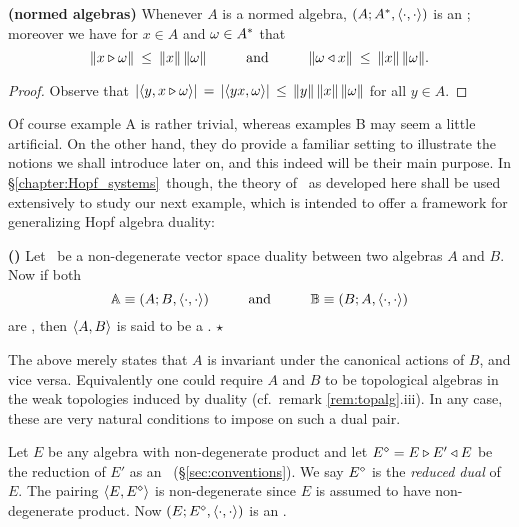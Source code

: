 \begin{exB} \label{exB:normed_algebra_context}  \rm
  {\bf (normed algebras)}  \hspace{0.6em}
  Whenever $A$ is a normed algebra, $(A; A^*, \langle\cdot, \cdot\rangle)$ is an \context;
  moreover we have for $x\in A$ and $\omega \in A^*$ that
  \begin{equation} \label{eq:exB:normed_algebra_context}
     \|x \lact \om\| \:\leq\:  \|x\|  \,  \|\om\|    \andspace{10mm}
     \|\om \ract x\| \:\leq\:  \|x\|  \,  \|\om\|.
  \end{equation}
\end{exB}
\begin{proof}
  Observe that
  $ |\langle y,x \triangleright \omega \rangle| \,=\, |\langle yx,\omega \rangle| \,\leq\,  \|y\|  \,  \|x\|  \, \|\omega\|$
  for all $y\in A$.
\end{proof}
\vspace{2ex}

{\small
Of course example A is rather trivial, whereas examples B may seem a little artificial.
On the other hand, they do provide a familiar setting to illustrate the notions we shall
introduce later on, and this indeed will be their main purpose.
In \S \ref{chapter:Hopf_systems}\ though, the theory of \contexts\ as
developed here shall be used extensively to study our next example,
which is intended to offer a framework for generalizing Hopf algebra duality:}


\begin{exC}  \label{exC:introduction} \rm
  {\bf (\dpa)}  \hspace{0.4em}
  Let \pairing\ be a non-degen\-erate vector space duality between two algebras
  $A$ and $B$\@. Now if both
  $$\Aa \equiv (A; B, \pairing)   \andspace{10mm}
    \BB \equiv (B; A, \pairing)$$
  are \contexts, then $\langle A,B \rangle$ is said to be a {\em \dpa}.
  \hfill $\star$
\end{exC}


  The above merely states that $A$ is invariant under the canonical actions of $B$,
  and vice versa. Equivalently one could require $A$ and $B$ to be topological algebras
  in the weak topologies induced by duality (cf.\ remark \ref{rem:topalg}.iii).
  In any case, these are very natural conditions to impose on such a dual pair.


\begin{exD} \label{exD:introduction} \rm
  Let $E$ be any algebra with non-degenerate product and let $E^\diamond = E\triangleright E' \triangleleft E$
  be the reduction of $E'$ as an \Ebimod\ (\S\ref{sec:conventions}).
  We say $E^\diamond$ is the {\em reduced dual\/} of $E$.
  The pairing $\langle E,E^\diamond \rangle$ is non-degenerate since $E$ is
  assumed to have non-degenerate product.
  Now $(E;E^\diamond,\langle\cdot, \cdot\rangle)$ is an \context.
\end{exD}




